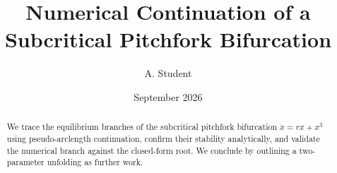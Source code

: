\documentclass[enabledeprecatedfontcommands]{icldt}
\title{Numerical Continuation of a Subcritical Pitchfork Bifurcation}
\author{A. Student}
\date{September 2026}
\begin{document}
\maketitle
\makedeclaration
\makecopyright
\makeacknowledgements

\begin{abstract}
We trace the equilibrium branches of the subcritical pitchfork
bifurcation $\dot{x} = rx + x^3$ using pseudo-arclength continuation,
confirm their stability analytically, and validate the numerical
branch against the closed-form root. We conclude by outlining a
two-parameter unfolding as further work.
\end{abstract}

\tableofcontents
\listoftables
\listoffigures








\appendix

\end{document}
